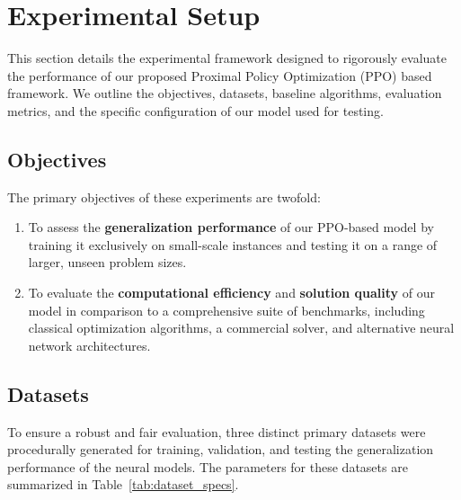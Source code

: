 
\section{Experimental Setup}
\label{sec:experimental_setup}

This section details the experimental framework designed to rigorously evaluate the performance of our proposed Proximal Policy Optimization (PPO) based framework. We outline the objectives, datasets, baseline algorithms, evaluation metrics, and the specific configuration of our model used for testing.

\subsection{Objectives}
The primary objectives of these experiments are twofold:
\begin{enumerate}
    \item To assess the \textbf{generalization performance} of our PPO-based model by training it exclusively on small-scale instances and testing it on a range of larger, unseen problem sizes.
    \item To evaluate the \textbf{computational efficiency} and \textbf{solution quality} of our model in comparison to a comprehensive suite of benchmarks, including classical optimization algorithms, a commercial solver, and alternative neural network architectures.
\end{enumerate}

\subsection{Datasets}
To ensure a robust and fair evaluation, three distinct primary datasets were procedurally generated for training, validation, and testing the generalization performance of the neural models. The parameters for these datasets are summarized in Table~\ref{tab:dataset_specs}.

